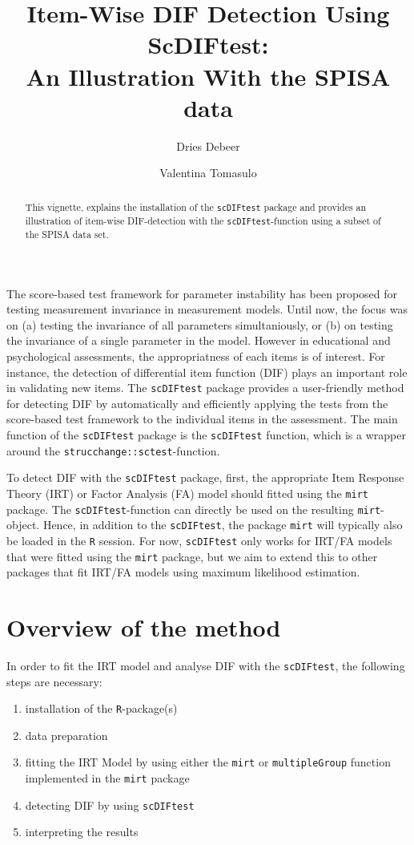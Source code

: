 \documentclass{article}
\title{Item-Wise DIF Detection Using ScDIFtest: \\
An Illustration With the SPISA data}
\author[1, 2]{Dries Debeer}
\author[2]{Valentina Tomasulo}
\affil[1]{ITEC, imec research group at KULeuven}
\affil[2]{Univeristy of Zurich}
\date{}                     %
\begin{document}
\maketitle

\begin{abstract}
This vignette, explains the installation of the {\tt scDIFtest} package and provides an illustration of item-wise DIF-detection with the {\tt scDIFtest}-function using a subset of the SPISA data set.
\end{abstract}


The score-based test framework for parameter instability has been proposed for testing measurement invariance in measurement models. Until now, the focus was on (a) testing the invariance of all parameters simultaniously, or (b) on testing the invariance of a single parameter in the model. However in educational and psychological assessments, the appropriatness of each items is of interest. For instance, the detection of differential item function (DIF) plays an important role in validating new items. The {\tt scDIFtest} package provides a user-friendly method for detecting DIF by automatically and efficiently applying the tests from the score-based test framework to the individual items in the assessment. The main function of the {\tt scDIFtest} package is the {\tt scDIFtest} function, which is a wrapper around the {\tt strucchange::sctest}-function. 


To detect DIF with the {\tt scDIFtest} package, first, the appropriate Item Response Theory (IRT) or Factor Analysis (FA) model should fitted using the {\tt mirt} package. The {\tt scDIFtest}-function can directly be used on the resulting {\tt mirt}-object. Hence, in addition to the {\tt scDIFtest}, the package {\tt mirt} will typically also be loaded in the {\tt R} session. For now, {\tt scDIFtest} only works for IRT/FA models that were fitted using the {\tt mirt} package, but we aim to extend this to other packages that fit IRT/FA models using maximum likelihood estimation. 



\section*{Overview of the method}

In order to fit the IRT model and analyse DIF with the {\tt scDIFtest}, the following steps are necessary:

\begin{enumerate}
\item installation of the {\tt R}-package(s)
\item data preparation
\item fitting the IRT Model by using either the {\tt mirt} or {\tt multipleGroup} function implemented in the {\tt mirt} package \cite{Chalmers}
\item detecting DIF by using {\tt scDIFtest} \cite{Debeer}
\item interpreting the results
\end{enumerate} 
\end{document}
